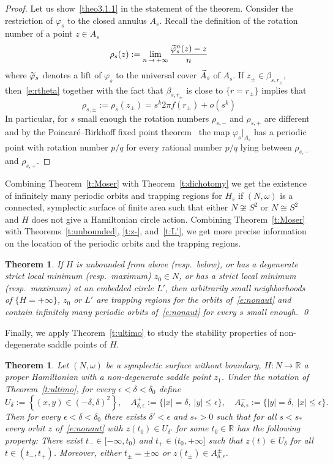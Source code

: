 \documentclass[10pt]{amsart}
\newtheorem{theo}[cdrthm]{Theorem}
\theoremstyle{definition}
\newcommand{\R}{\mathbb{R}}
\let\oldtilde\tilde
\renewcommand*{\tilde}[1]{\mathchoice{\widetilde{#1}}{\widetilde{#1}}{\oldtilde{#1}}{\oldtilde{#1}}}
\begin{document}
\begin{proof}
Let us show~\eqref{theo3.1.1} in the statement of the theorem. Consider the restriction of $\varphi_s$ to the closed annulus $A_s$. Recall the definition of the rotation number of a point $z\in A_s$
\[
\rho_s(z) := \lim_{n\,\to\,+\infty} \frac{\tilde \varphi^n_s(z)-z}{n}
\]
where $\tilde \varphi_s$ denotes a lift of $\varphi_s$ to the universal cover $\tilde A_s$ of $A_s$. If $z_\pm\in\beta_{s,r_\pm}$, then~\eqref{e:rtheta} together with the fact that $\beta_{s,r_\pm}$ is close to $\{r=r_\pm\}$ implies that
\[
\rho_{s,\pm}:=\rho_s\left(z_\pm\right) = s^k2\pi f\left(r_\pm\right) + o(s^k)
\]
In particular, for $s$ small enough the rotation numbers $\rho_{s,-}$ and $\rho_{s,+}$ are different and by the Poincaré--Birkhoff fixed point theorem~\cite[Theorem~7.1]{Gole:2001vx} the map $\varphi_s|_{A_s}$ has a periodic point with rotation number $p/q$ for every rational number $p/q$ lying between $\rho_{s,-}$ and $\rho_{s,+}$.
\end{proof}

Combining Theorem~\ref{t:Moser} with Theorem~\ref{t:dichotomy} we get the existence of infinitely many periodic orbits and trapping regions for $H_s$ if $(N,\omega)$ is a connected, symplectic surface of finite area such that either $N\not\cong S^2$ or $N\cong S^2$ and $H$ does not give a Hamiltonian circle action. Combining Theorem~\ref{t:Moser} with Theorems~\ref{t:unbounded}, \ref{t:z-}, and~\ref{t:L'}, we get more precise information on the location of the periodic orbits and the trapping regions.


\begin{theo}\label{t:three}
If $H$ is unbounded from above (resp.~below), or has a degenerate strict local minimum (resp.~maximum) $z_0\in N$, or has a strict local minimum (resp.~maximum) at an embedded circle $L'$, then arbitrarily small neighborhoods of $\{H=+\infty\}$, $z_0$ or $L'$ are trapping regions for the orbits of~\eqref{e:nonaut} and contain infinitely many periodic orbits of~\eqref{e:nonaut} for every $s$ small enough. \qed
\end{theo}

Finally, we apply Theorem~\ref{t:ultimo} to study the stability properties of non-degenerate saddle points of $H$.

\begin{theo}\label{t:saddle}
Let $(N,\omega)$ be a symplectic surface without boundary, $H:N\to\R$ a proper Hamiltonian with a non-degenerate saddle point $z_1$. Under the notation of Theorem~\ref{t:ultimo}, for every $\epsilon<\delta<\delta_0$ define
\[
U_\delta:=\left\{(x,y)\in(-\delta,\delta)^2\right\},\quad A_{\delta,\epsilon}^+:=\big\{|x|=\delta,\ |y|\leq \epsilon\big\},\quad A_{\delta,\epsilon}^-:=\big\{|y|=\delta,\ |x|\leq \epsilon\big\}.
\]
Then for every $\epsilon<\delta<\delta_0$ there exists $\delta'<\epsilon$ and $s_*>0$ such that for all $s<s_*$ every orbit $z$ of~\eqref{e:nonaut} with $z(t_0)\in U_{\delta'}$ for some $t_0\in \R$ has the following property: There exist $t_-\in[-\infty,t_0)$ and $t_+\in(t_0,+\infty]$ such that $z(t)\in U_\delta$ for all $t\in(t_-,t_+)$. Moreover, either $t_\pm=\pm\infty$ or $z(t_\pm)\in A^\pm_{\delta,\epsilon}$.
\end{theo}
\end{document}

